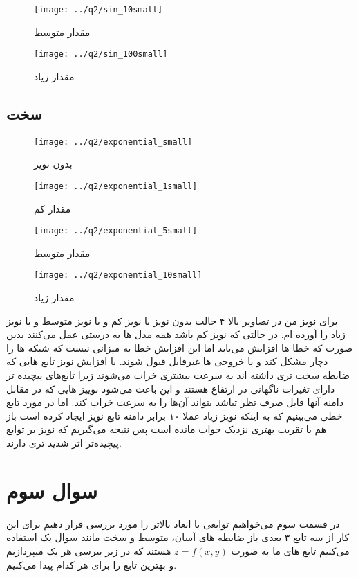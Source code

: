 \documentclass[a4paper,12pt]{article}
\begin{document}
\begin{figure}[!htb]
  \texttt{[image: ../q2/sin\_10small]}
  \caption{مقدار متوسط}
\endminipage\hfill
{}
  \texttt{[image: ../q2/sin\_100small]}
  \caption{مقدار زیاد}
\endminipage\hfill
\end{figure}

\newpage
\subsection{سخت}

\begin{figure}[!htb]
  \texttt{[image: ../q2/exponential\_small]}
  \caption{بدون نویز}
\endminipage\hfill
{}
  \texttt{[image: ../q2/exponential\_1small]}
  \caption{مقدار کم}
\endminipage\hfill
\end{figure}


\begin{figure}[!htb]
  \texttt{[image: ../q2/exponential\_5small]}
  \caption{مقدار متوسط}
\endminipage\hfill
{}
  \texttt{[image: ../q2/exponential\_10small]}
  \caption{مقدار زیاد}
\endminipage\hfill
\end{figure}

برای نویز من در تصاویر بالا ۴ حالت بدون نویز با نویز کم و با نویز متوسط و با نویز زیاد را آورده ام. در حالتی که نویز کم باشد همه مدل ها به درستی عمل می‌کنند بدین صورت که خطا ها افزایش می‌یابد اما این افزایش خطا به میزانی نیست که شبکه ها را دچار مشکل کند و یا خروجی ها غیرقابل قبول شوند. با افزایش نویز تابع هایی که ضابطه سخت تری داشته اند به سرعت بیشتری خراب می‌شوند زیرا تابع‌های پیچیده تر دارای تغیرات ناگهانی در ارتفاع هستند و این باعث می‌شود نوییز هایی که در مقابل دامنه آنها قابل صرف تظر تباشد بتواند آن‌ها را به سرعت خراب کند. اما در مورد تابع خطی می‌بینیم که به اینکه نویز زیاد عملا ۱۰ برابر دامنه تابع نویز ایجاد کرده است باز هم با تقریب بهتری نزدیک جواب مانده است پس نتیجه می‌گیریم که نویز بر توابع پیچیده‌تر اثر شدید تری دارند.

\newpage
\section{سوال سوم}
در قسمت سوم می‌خواهیم توابعی با ابعاد بالاتر را مورد بررسی قرار دهیم برای این کار از سه تابع ۳ بعدی باز ضابطه های آسان، متوسط و سخت مانند سوال یک استفاده می‌کنیم تابع های ما به صورت $ z = f(x,y) $  هستند که در زیر ببرسی هر یک میپردازیم و بهترین تابع را برای هر کدام پیدا می‌کنیم.
\end{document}
